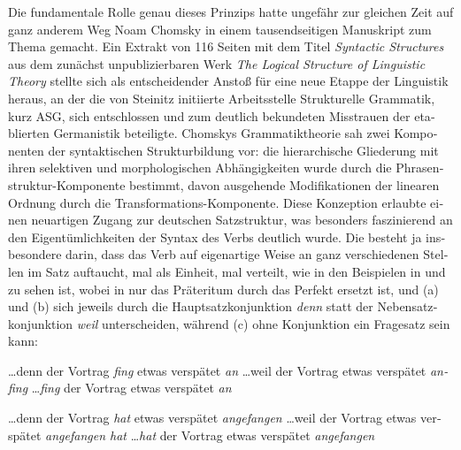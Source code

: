 \documentclass[output=paper,colorlinks,citecolor=brown]{langscibook}
\begin{document}
\begin{otherlanguage}{german}
Die fundamentale Rolle genau dieses Prinzips hatte ungefähr zur gleichen Zeit auf ganz anderem Weg Noam Chomsky in einem tausendseitigen Manuskript zum Thema gemacht. Ein Extrakt von 116 Seiten mit dem Titel \textit{Syntactic Structures} \citep{bi:Chomsky1957} aus dem zunächst unpublizierbaren Werk \textit{The Logical Structure of Linguistic Theory} stellte sich als entscheidender Anstoß für eine neue Etappe der Linguistik heraus, an der die von Steinitz initiierte \glqq Arbeitsstelle Strukturelle Grammatik\grqq, kurz ASG, sich entschlossen und zum deutlich bekundeten Misstrauen der etablierten Germanistik beteiligte. Chomskys Grammatiktheorie sah zwei Komponenten der syntaktischen Strukturbildung vor: die hie\-rarchische Gliederung mit ihren selektiven und morphologischen Abhängigkeiten wurde durch die Phrasenstruktur-Komponente bestimmt, davon ausgehende Modifikationen der linearen Ordnung durch die Transformations-Komponente. Diese Konzeption erlaubte einen neuartigen Zugang zur deutschen Satzstruktur, was besonders faszinierend an den Eigentümlichkeiten der Syntax des Verbs deutlich wurde. Die besteht ja insbesondere darin, dass das Verb auf eigenartige Weise an ganz verschiedenen Stellen im Satz auftaucht, mal als Einheit, mal verteilt, wie in den Beispielen in  und  zu sehen ist, wobei in  nur das Präteritum durch das Perfekt ersetzt ist, und (a) und (b) sich jeweils durch die Hauptsatzkonjunktion \textit{denn} statt der Nebensatzkonjunktion \textit{weil} unterscheiden, während (c) ohne Konjunktion ein Fragesatz sein kann:

\ea
\ea \ldots denn der Vortrag \textit{fing} etwas verspätet \textit{an} \label{ex:2a}
\ex \ldots weil der Vortrag etwas verspätet \textit{anfing} \label{ex:2b}
\ex \ldots \textit{fing} der Vortrag etwas verspätet \textit{an} \label{ex:2c}
\z
\label{ex:2}
\z

\ea 
\ea \ldots denn der Vortrag \textit{hat} etwas verspätet \textit{angefangen} \label{ex:3a}
\ex \ldots weil der Vortrag etwas verspätet \textit{angefangen hat} \label{ex:3b}
\ex \ldots \textit{hat} der Vortrag etwas verspätet \textit{angefangen} \label{ex:3c}
\z
\label{ex:3}
\z


\end{otherlanguage}
\end{document}
